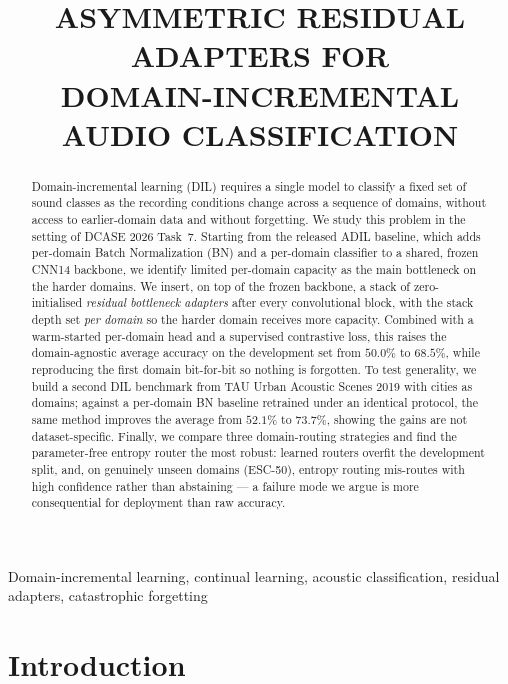 \documentclass[9pt,conference]{IEEEtran}
\title{ASYMMETRIC RESIDUAL ADAPTERS FOR\\
DOMAIN-INCREMENTAL AUDIO CLASSIFICATION}
\begin{document}
\maketitle
\sloppy

\begin{abstract}
Domain-incremental learning (DIL) requires a single model to classify a
fixed set of sound classes as the recording conditions change across a
sequence of domains, without access to earlier-domain data and without
forgetting. We study this problem in the setting of DCASE 2026 Task~7.
Starting from the released ADIL baseline, which adds per-domain
Batch Normalization (BN) and a per-domain classifier to a shared, frozen
CNN14 backbone, we identify limited per-domain capacity as the main
bottleneck on the harder domains. We insert, on top of the frozen backbone,
a stack of zero-initialised \emph{residual bottleneck adapters} after every
convolutional block, with the stack depth set \emph{per domain} so the
harder domain receives more capacity. Combined with a warm-started
per-domain head and a supervised contrastive loss, this raises the
domain-agnostic average accuracy on the development set from $50.0\%$ to
$68.5\%$, while reproducing the first domain bit-for-bit so nothing is
forgotten. To test generality, we build a second DIL benchmark from TAU
Urban Acoustic Scenes 2019 with cities as domains; against a per-domain BN
baseline retrained under an identical protocol, the same method improves
the average from $52.1\%$ to $73.7\%$, showing the gains are not
dataset-specific. Finally, we
compare three domain-routing strategies and find the parameter-free entropy
router the most robust: learned routers overfit the development split, and,
on genuinely unseen domains (ESC-50), entropy routing mis-routes with high
confidence rather than abstaining --- a failure mode we argue is more
consequential for deployment than raw accuracy.
\end{abstract}

\begin{IEEEkeywords}
Domain-incremental learning, continual learning, acoustic
classification, residual adapters, catastrophic forgetting
\end{IEEEkeywords}


\section{Introduction}
\label{sec:intro}
\end{document}
